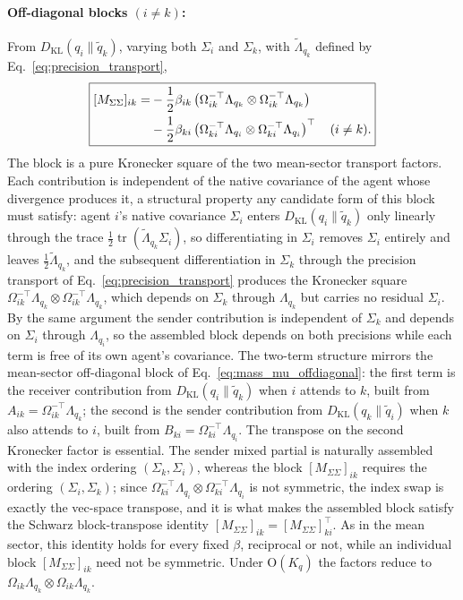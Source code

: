 \documentclass[11pt]{article}
\begin{document}
\paragraph{Off-diagonal blocks $(i \neq k)$:} From $D_{\mathrm{KL}}(q_i \| \tilde{q}_k)$, varying both $\Sigma_i$ and $\Sigma_k$, with $\tilde{\Lambda}_{q_k}$ defined by Eq.~\eqref{eq:precision_transport},
\begin{equation}
\boxed{\begin{aligned}
\relax [M_{\Sigma\Sigma}]_{ik} = &-\frac{1}{2}\beta_{ik}\left(\Omega_{ik}^{-\top}\Lambda_{q_k} \otimes \Omega_{ik}^{-\top}\Lambda_{q_k}\right) \\
&-\frac{1}{2}\beta_{ki}\left(\Omega_{ki}^{-\top}\Lambda_{q_i} \otimes \Omega_{ki}^{-\top}\Lambda_{q_i}\right)^\top \quad (i \neq k).
\end{aligned}}
\label{eq:mass_sigma_offdiagonal}
\end{equation}
The block is a pure Kronecker square of the two mean-sector transport factors. Each contribution is independent of the native covariance of the agent whose divergence produces it, a structural property any candidate form of this block must satisfy: agent $i$'s native covariance $\Sigma_i$ enters $D_{\mathrm{KL}}(q_i \| \tilde{q}_k)$ only linearly through the trace $\frac{1}{2}\operatorname{tr}(\tilde{\Lambda}_{q_k}\Sigma_i)$, so differentiating in $\Sigma_i$ removes $\Sigma_i$ entirely and leaves $\frac{1}{2}\tilde{\Lambda}_{q_k}$, and the subsequent differentiation in $\Sigma_k$ through the precision transport of Eq.~\eqref{eq:precision_transport} produces the Kronecker square $\Omega_{ik}^{-\top}\Lambda_{q_k} \otimes \Omega_{ik}^{-\top}\Lambda_{q_k}$, which depends on $\Sigma_k$ through $\Lambda_{q_k}$ but carries no residual $\Sigma_i$. By the same argument the sender contribution is independent of $\Sigma_k$ and depends on $\Sigma_i$ through $\Lambda_{q_i}$, so the assembled block depends on both precisions while each term is free of its own agent's covariance. The two-term structure mirrors the mean-sector off-diagonal block of Eq.~\eqref{eq:mass_mu_offdiagonal}: the first term is the receiver contribution from $D_{\mathrm{KL}}(q_i \| \tilde{q}_k)$ when $i$ attends to $k$, built from $A_{ik} = \Omega_{ik}^{-\top}\Lambda_{q_k}$; the second is the sender contribution from $D_{\mathrm{KL}}(q_k \| \tilde{q}_i)$ when $k$ also attends to $i$, built from $B_{ki} = \Omega_{ki}^{-\top}\Lambda_{q_i}$. The transpose on the second Kronecker factor is essential. The sender mixed partial is naturally assembled with the index ordering $(\Sigma_k, \Sigma_i)$, whereas the block $[M_{\Sigma\Sigma}]_{ik}$ requires the ordering $(\Sigma_i, \Sigma_k)$; since $\Omega_{ki}^{-\top}\Lambda_{q_i} \otimes \Omega_{ki}^{-\top}\Lambda_{q_i}$ is not symmetric, the index swap is exactly the vec-space transpose, and it is what makes the assembled block satisfy the Schwarz block-transpose identity $[M_{\Sigma\Sigma}]_{ik} = [M_{\Sigma\Sigma}]_{ki}^\top$. As in the mean sector, this identity holds for every fixed $\beta$, reciprocal or not, while an individual block $[M_{\Sigma\Sigma}]_{ik}$ need not be symmetric. Under $\mathrm{O}(K_q)$ the factors reduce to $\Omega_{ik}\Lambda_{q_k} \otimes \Omega_{ik}\Lambda_{q_k}$.
\end{document}
